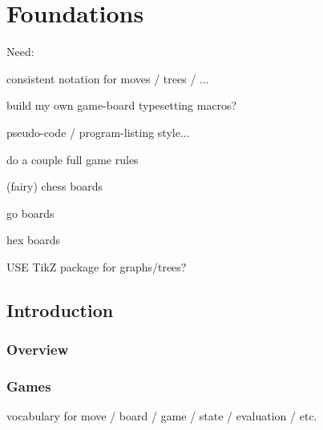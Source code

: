 \documentclass[10pt,dvipdfmx]{report}
\begin{document}

\tableofcontents

\part{Foundations}





Need:

consistent notation for moves / trees / ...

build my own game-board typesetting macros?

pseudo-code / program-listing style...

do a couple full game rules

(fairy) chess boards

go boards

hex boards

USE TikZ package for graphs/trees?

\chapter{Introduction}
\label{chap-introduction}

\section{Overview}

\section{Games}

vocabulary for move / board / game / state / evaluation / etc.
\end{document}
